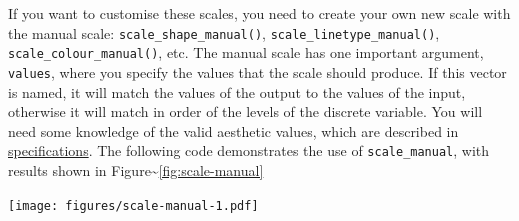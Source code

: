 If you want to customise these scales, you need to create your own new
scale with the manual scale: \texttt{scale\_shape\_manual()},
\texttt{scale\_linetype\_manual()}, \texttt{scale\_colour\_manual()},
etc. The manual scale has one important argument, \texttt{values}, where
you specify the values that the scale should produce. If this vector is
named, it will match the values of the output to the values of the
input, otherwise it will match in order of the levels of the discrete
variable. You will need some knowledge of the valid aesthetic values,
which are described in \hyperref[cha:specifications]{specifications}.
The following code demonstrates the use of \texttt{scale\_manual}, with
results shown in Figure\textasciitilde{}\ref{fig:scale-manual}
 

\begin{Shaded}
\begin{Highlighting}[]
\StringTok{ }  \NormalTok{)}
\StringTok{ }\NormalTok{(} \StringTok{ }
\StringTok{  }\NormalTok{(} \NormalTok{(}\NormalTok{, }\NormalTok{, }\NormalTok{, }\NormalTok{))}
\end{Highlighting}
\end{Shaded}

\texttt{[image: figures/scale-manual-1.pdf]}

\begin{Shaded}
\begin{Highlighting}[]
\StringTok{ }\NormalTok{(} \NormalTok{, } \NormalTok{, } \NormalTok{, } \NormalTok{)}
\StringTok{ }\NormalTok{(} \StringTok{ }\NormalTok{(} 
\end{Highlighting}
\end{Shaded}

